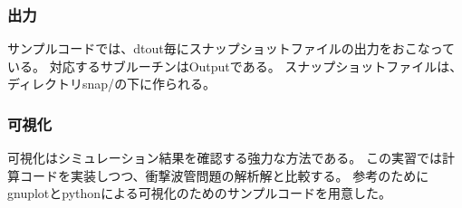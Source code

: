 \subsubsection{出力}

サンプルコードでは、{\ttfamily dtout}毎にスナップショットファイルの出力をおこなっている。
対応するサブルーチンは{\ttfamily Output}である。
スナップショットファイルは、ディレクトリ{\ttfamily snap/}の下に作られる。

\subsubsection{可視化}

可視化はシミュレーション結果を確認する強力な方法である。
この実習では計算コードを実装しつつ、衝撃波管問題の解析解と比較する。
参考のために{\ttfamily gnuplot}と{\ttfamily python}による可視化のためのサンプルコードを用意した。

